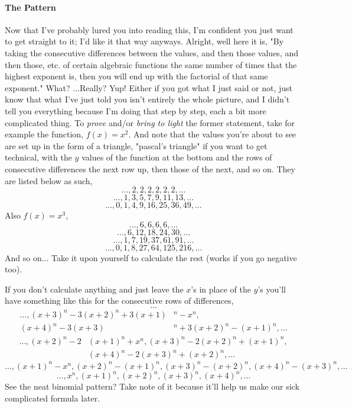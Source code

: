 \documentclass[12pt, letterpaper]{report}
\begin{document}
\paragraph{The Pattern}Now that I've probably lured you into reading this, I'm confident you just want to get straight to it; I'd like it that way anyways. Alright, well here it is, "By taking the consecutive differences between the values, and then those values, and then those, etc. of certain algebraic functions the same number of times that the highest exponent is, then you will end up with the factorial of that same exponent." What? ...Really? Yup! Either if you got what I just said or not, just know that what I've just told you isn't entirely the whole picture, and I didn't tell you everything because I'm doing that step by step, each a bit more complicated thing. To \textit{prove} and/or \textit{bring to light} the former statement, take for example the function, $f(x)=x^2$. And note that the values you're about to see are set up in the form of a triangle, "pascal's triangle" if you want to get technical, with the $y$ values of the function at the bottom and the rows of consecutive differences the next row up, then those of the next, and so on. They are listed below as such,
$$\dots, 2, 2, 2, 2, 2, 2, \dots$$
$$\dots, 1, 3, 5, 7, 9, 11, 13, \dots$$
\begin{equation}\dots, 0, 1, 4, 9, 16, 25, 36, 49, \dots\end{equation}
Also $f(x)=x^3$,
$$\dots, 6, 6, 6, 6, \dots$$
$$\dots, 6, 12, 18, 24, 30, \dots$$
$$\dots, 1, 7, 19, 37, 61, 91, \dots$$
\begin{equation}\dots, 0, 1, 8, 27, 64, 125, 216, \dots\end{equation}
And so on... Take it upon yourself to calculate the rest (works if you go negative too).

If you don't calculate anything and just leave the $x$'s in place of the $y$'s you'll have something like this for the consecutive rows of differences,
$$\dots$$
\begin{equation*}
\begin{split}
\dots, (x+3)^n-3(x+2)^n+3(x+1)&^n-x^n,  \\
(x+4)^n-3(x+3)&^n+3(x+2)^n-(x+1)^n, \dots
\end{split}
\end{equation*}
\begin{equation*}
\begin{split}
\dots, (x+2)^n-2&(x+1)^n+x^n, (x+3)^n-2(x+2)^n+(x+1)^n, \\
&(x+4)^n-2(x+3)^n+(x+2)^n, \dots
\end{split}
\end{equation*}
$$\dots, (x+1)^n-x^n, (x+2)^n-(x+1)^n, (x+3)^n-(x+2)^n, (x+4)^n-(x+3)^n, \dots$$
\begin{equation}\dots, x^n, (x+1)^n, (x+2)^n, (x+3)^n, (x+4)^n, \dots\end{equation}
See the neat binomial pattern? Take note of it because it'll help us make our sick complicated formula later.
\end{document}
